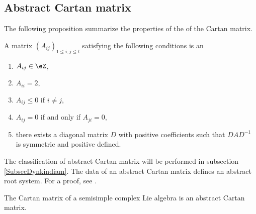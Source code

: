 \subsection{Abstract Cartan matrix}

The following proposition summarize the properties of the of the Cartan matrix.
\begin{definition}      \label{DeabstrCartanmatr}
    A matrix \( (A_{ij})_{1\leq i,j\leq l}\) satisfying the following conditions is an 
    \begin{enumerate}
        \item
            \( A_{ij}\in\eZ\),
        \item
            \( A_{ii}=2\),
        \item   \label{ItempoprCartaniii}
            \( A_{ij}\leq 0\) if \( i\neq j\),
        \item
            \( A_{ij}=0\) if and only if \( A_{ji}=0\),
        \item\label{ItempoprCartanv}
            there exists a diagonal matrix \( D\) with positive coefficients such that \( DAD^{-1}\) is symmetric and positive defined.
    \end{enumerate}
\end{definition}
The classification of abstract Cartan matrix will be performed in subsection \ref{SubsecDynkindiam}. The data of an abstract Cartan matrix defines an abstract root system. For a proof, see \cite{CartanRootProject}.

\begin{proposition}
    The Cartan matrix of a semisimple complex Lie algebra is an abstract Cartan matrix.
\end{proposition}

